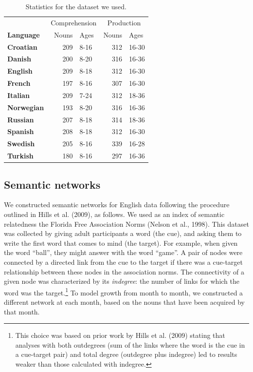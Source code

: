 \documentclass[english,floatsintext,man]{apa6}
\theoremstyle{definition}
\theoremstyle{definition}
\theoremstyle{definition}
\theoremstyle{remark}
\begin{document}
\begin{table}

\caption{\label{tab:stats}Statistics for the dataset we used.}
\centering
\begin{tabular}[t]{>{\bfseries}lrlrl}
\toprule
\multicolumn{1}{c}{} & \multicolumn{2}{c}{Comprehension} & \multicolumn{2}{c}{Production} \\
\cmidrule(l{2pt}r{2pt}){2-3} \cmidrule(l{2pt}r{2pt}){4-5}
Language & Nouns & Ages & Nouns & Ages\\
\midrule
Croatian & 209 & 8-16 & 312 & 16-30\\
Danish & 200 & 8-20 & 316 & 16-36\\
English & 209 & 8-18 & 312 & 16-30\\
French & 197 & 8-16 & 307 & 16-30\\
Italian & 209 & 7-24 & 312 & 18-36\\
Norwegian & 193 & 8-20 & 316 & 16-36\\
Russian & 207 & 8-18 & 314 & 18-36\\
Spanish & 208 & 8-18 & 312 & 16-30\\
Swedish & 205 & 8-16 & 339 & 16-28\\
Turkish & 180 & 8-16 & 297 & 16-36\\
\bottomrule
\end{tabular}
\end{table}

\subsection{Semantic networks}\label{semantic-networks}

We constructed semantic networks for English data following the
procedure outlined in Hills et al. (2009), as follows. We used as an
index of semantic relatedness the Florida Free Association Norms (Nelson
et al., 1998). This dataset was collected by giving adult participants a
word (the cue), and asking them to write the first word that comes to
mind (the target). For example, when given the word \enquote{ball}, they
might answer with the word \enquote{game}. A pair of nodes were
connected by a directed link from the cue to the target if there was a
cue-target relationship between these nodes in the association norms.
The connectivity of a given node was characterized by its
\emph{indegree}: the number of links for which the word was the
target.\footnote{This choice was based on prior work by Hills et al. (2009) stating that analyses with both outdegrees (sum of the links where the word is the cue in a cue-target pair) and total degree  (outdegree plus indegree) led to results weaker than those calculated with indegree.}
To model growth from month to month, we constructed a different network
at each month, based on the nouns that have been acquired by that month.
\end{document}
